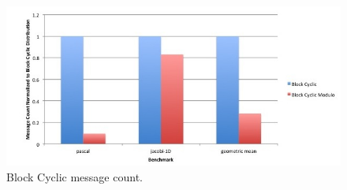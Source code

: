 \begin{figure}
	\begin{center}
	\includegraphics[scale=0.50]{./Figures/block_cyclic_message_count}
	\caption{Block Cyclic message count.}
	\label{block_cyclic_message_count}
	\end{center}
\end{figure}
